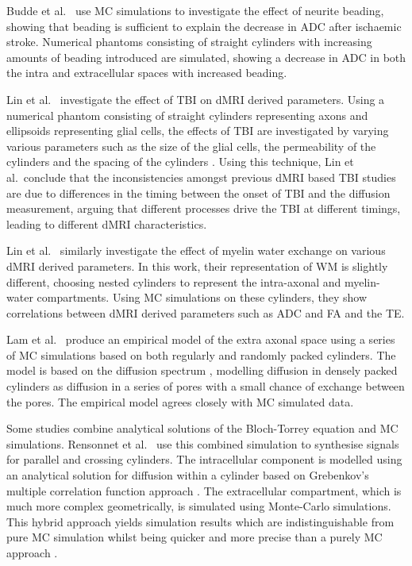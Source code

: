 Budde et al.\ \cite{Budde2010} use \ac{MC} simulations to investigate the effect of neurite beading, showing that beading is sufficient to explain the decrease in \ac{ADC} after ischaemic stroke. Numerical phantoms consisting of straight cylinders with increasing amounts of beading introduced are simulated, showing a decrease in \ac{ADC} in both the intra and extracellular spaces with increased beading. 

Lin et al.\ \cite{Lin2016} investigate the effect of \ac{TBI} on \ac{dMRI} derived parameters.
Using a numerical phantom consisting of straight cylinders representing axons and ellipsoids representing glial cells, the effects of \ac{TBI} are investigated by varying various parameters such as the size of the glial cells, the permeability of the cylinders and the spacing of the cylinders \cite{Lin2016}. 
Using this technique, Lin et al.\ conclude that the inconsistencies amongst previous \ac{dMRI} based \ac{TBI} studies \cite{Huisman2004,Bazarian2007,Rutgers2008} are due to differences in the timing between the onset of \ac{TBI} and the diffusion measurement, arguing that different processes drive the \ac{TBI} at different timings, leading to different \ac{dMRI} characteristics. 

Lin et al.\ \cite{Lin2017} similarly investigate the effect of myelin water exchange on various \ac{dMRI} derived parameters. In this work, their representation of \ac{WM} is slightly different, choosing nested cylinders to represent the intra-axonal and myelin-water compartments.
Using \ac{MC} simulations on these cylinders, they show correlations between \ac{dMRI} derived parameters such as \ac{ADC} and \ac{FA} and the \acl{TE}.

Lam et al.\ \cite{Lam2015} produce an empirical model of the extra axonal space using a series of \ac{MC} simulations based on both regularly and randomly packed cylinders. The model is based on the diffusion spectrum \cite{Stepisnik1993}, modelling diffusion in densely packed cylinders as diffusion in a series of pores with a small chance of exchange between the pores.
The empirical model agrees closely with \ac{MC} simulated data.

Some studies combine analytical solutions of the Bloch-Torrey equation and \ac{MC} simulations.
Rensonnet et al.\ \cite{Rensonnet2015} use this combined simulation to synthesise signals for parallel and crossing cylinders.
The intracellular component is modelled using an analytical solution for diffusion within a cylinder based on Grebenkov's multiple correlation function approach \cite{Grebenkov2008}.
The extracellular compartment, which is much more complex geometrically, is simulated using Monte-Carlo simulations.
This hybrid approach yields simulation results which are indistinguishable from pure \ac{MC} simulation whilst being quicker and more precise than a purely \ac{MC} approach \cite{Rensonnet2015}. 

